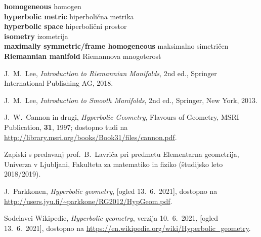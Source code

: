 \documentclass[a4paper]{article}
\newcommand{\geslo}[2]{\noindent\textbf{#1} \quad \hangindent=1cm #2\\[-1pc]}
\begin{document}
\geslo{homogeneous}{homogen}

\geslo{hyperbolic metric}{hiperbolična metrika}

\geslo{hyperbolic space}{hiperbolični prostor}

\geslo{isometry}{izometrija}

\geslo{maximally symmetric/frame homogeneous}{maksimalno simetričen}

\geslo{Riemannian manifold}{Riemannova mnogoterost}


\begin{thebibliography}{99}

 J.~M.~Lee, \emph{Introduction to Riemannian Manifolds}, 2nd ed., Springer International Publishing AG, 2018.

 J.~M.~Lee, \emph{Introduction to Smooth Manifolds}, 2nd ed., Springer, New York, 2013.

 J.~W.~Cannon in drugi, \emph{Hyperbolic Geometry}, Flavours of Geometry, MSRI Publication, \textbf{31}, 1997; dostopno tudi na \url{http://library.msri.org/books/Book31/files/cannon.pdf}.

 Zapiski s predavanj prof.~B.~Lavriča pri predmetu Elementarna geometrija, Univerza v Ljubljani, Fakulteta za matematiko in fiziko (študijsko leto 2018/2019).

 J.~Parkkonen, \emph{Hyperbolic geometry}, [ogled 13.~6.~2021], dostopno na \url{http://users.jyu.fi/~parkkone/RG2012/HypGeom.pdf}.

 Sodelavci Wikipedie, \emph{Hyperbolic geometry}, verzija 10.~6.~2021, [ogled 13.~6.~2021], dostopno na \url{https://en.wikipedia.org/wiki/Hyperbolic_geometry}.

\end{thebibliography}
\end{document}
